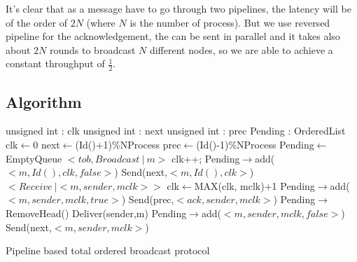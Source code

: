 \documentclass[a4paper]{article}
\begin{document}
It's clear that as a message have to go through two pipelines, the latency will
be of the order of $2N$ (where $N$ is the number of process). But we use
reversed pipeline for the acknowledgement, the can be sent in parallel and it
takes also about $2N$ rounds to broadcast $N$ different nodes, so we are able
to achieve a constant throughput of $\frac{1}{2}$.

\subsection{Algorithm}
\begin{algorithm}[H]
    \centering
    \begin{algorithmic}[5]
        \Data
        \State unsigned int : clk
        \State unsigned int : next
        \State unsigned int : prec
        \State Pending : OrderedList
        \EndData
        \Init
        \State clk$\gets$0
        \State next$\gets$(Id()+1)\%NProcess
        \State prec$\gets$(Id()-1)\%NProcess
        \State Pending$\gets$EmptyQueue
        \EndInit
        \Event $< tob,Broadcast\ |\ m> $
        \State clk++;
        \State Pending$\rightarrow$add($<m,Id(), clk, false>$) 
        \State Send(next,$<m,Id(),clk>$)
        \Else
        \EndIf
        \EndEvent
        \Event $<Receive\ | <m,sender, mclk>>$
        \State clk$\gets$MAX(clk, mclk)+1
        \State Pending$\rightarrow$add($<m,sender,mclk,true>$)
        \State Send(prec,$<ack,sender,mclk>$)
        \State Pending$\rightarrow$RemoveHead()
        \State Deliver(sender,m)
        \EndIf
        \Else
        \State Pending$\rightarrow$add($<m,sender,mclk,false>$)
        \State Send(next,$<m,sender,mclk>$)
        \EndIf
        \EndEvent
    \end{algorithmic}
    \caption{Pipeline based total ordered broadcast protocol}
\end{algorithm}
\end{document}
